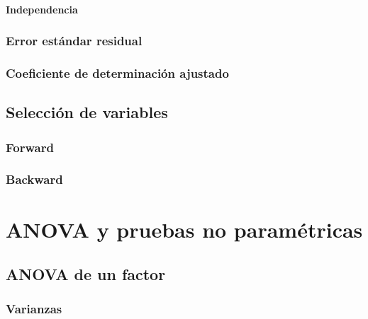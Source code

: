 \documentclass[
]{book}
\theoremstyle{definition}
\theoremstyle{definition}
\theoremstyle{definition}
\theoremstyle{definition}
\theoremstyle{remark}
\begin{document}
\hypertarget{independencia-1}{%
\subsubsection*{Independencia}\label{independencia-1}}

\hypertarget{error-estuxe1ndar-residual-1}{%
\subsection{Error estándar residual}\label{error-estuxe1ndar-residual-1}}

\hypertarget{coeficiente-de-determinaciuxf3n-ajustado}{%
\subsection{Coeficiente de determinación ajustado}\label{coeficiente-de-determinaciuxf3n-ajustado}}

\hypertarget{selecciuxf3n-de-variables}{%
\section{Selección de variables}\label{selecciuxf3n-de-variables}}

\hypertarget{forward}{%
\subsection{Forward}\label{forward}}

\hypertarget{backward}{%
\subsection{Backward}\label{backward}}

\hypertarget{anova-y-pruebas-no-paramuxe9tricas}{%
\chapter{ANOVA y pruebas no paramétricas}\label{anova-y-pruebas-no-paramuxe9tricas}}

\hypertarget{anova-de-un-factor}{%
\section{ANOVA de un factor}\label{anova-de-un-factor}}

\hypertarget{varianzas}{%
\subsection{Varianzas}\label{varianzas}}
\end{document}
